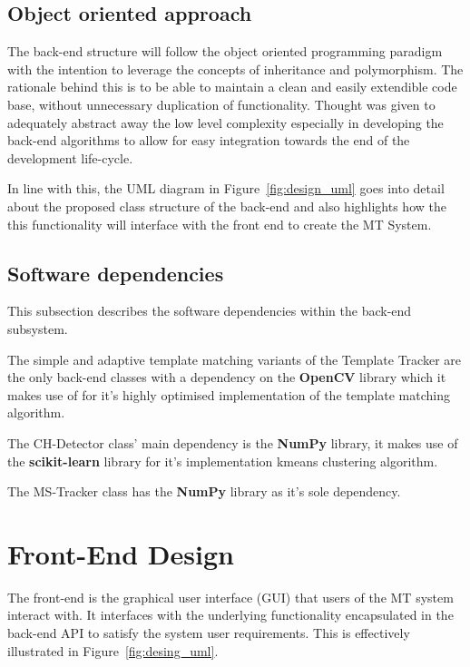 \subsection{Object oriented approach}
The back-end structure will follow the object oriented programming paradigm with
the intention to leverage the concepts of inheritance and polymorphism. The
rationale behind this is to be able to maintain a clean and easily extendible
code base, without unnecessary duplication of functionality. Thought was given
to adequately abstract away the low level complexity especially in developing
the back-end algorithms to allow for easy integration towards the end of the
development life-cycle. 

In line with this, the UML diagram in Figure~\ref{fig:design_uml} goes into
detail about the proposed class structure of the back-end and also highlights how the 
this functionality will interface with the front end to create the MT System.


\subsection{Software dependencies}
This subsection describes the software dependencies within the back-end
subsystem.

The simple and adaptive template matching variants of the Template Tracker are
the only back-end classes with a dependency on the \textbf{OpenCV} library which
it makes use of for it's highly optimised implementation of the
template matching algorithm.

The CH-Detector class' main dependency is the \textbf{NumPy} library, it makes
use of the \textbf{scikit-learn} library for it's implementation kmeans clustering
algorithm.

The MS-Tracker class has the \textbf{NumPy} library as it's sole dependency.

\section{Front-End Design}
The front-end is the graphical user interface (GUI) that users of the MT
system interact with. 
It interfaces with the underlying functionality encapsulated in the back-end API to
satisfy the system user requirements. This is effectively illustrated in
Figure~\ref{fig:desing_uml}. 

